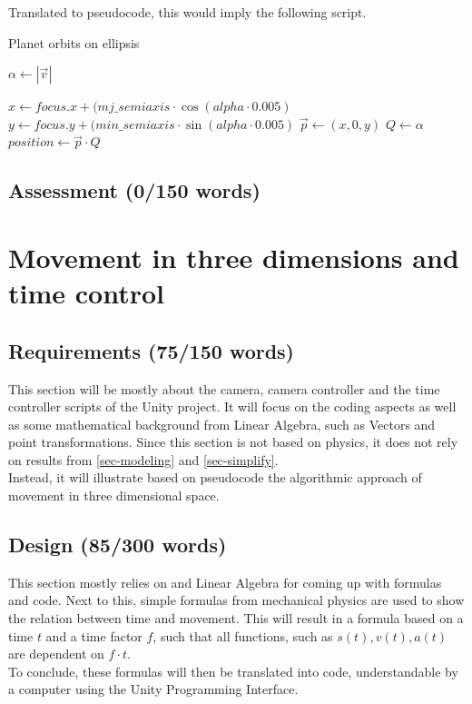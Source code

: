 \documentclass[conference,compsoc]{IEEEtran}
\begin{document}
Translated to pseudocode, this would imply the following script.
\begin{algorithm}
	\caption{Planet orbits on ellipsis}
	\begin{algorithmic}[1]
			\State $\alpha \leftarrow |\vec{v}|$ 
			
			\State $x \leftarrow focus.x + (mj\_semiaxis \cdot \cos(alpha \cdot 0.005)$
			\State $y \leftarrow focus.y + (min\_semiaxis \cdot \sin(alpha \cdot 0.005)$
			\State $\vec{p} \leftarrow (x, 0, y)$ 
			\State $Q \leftarrow \alpha$ 
			\State $position \leftarrow \vec{p} \cdot Q$
		\EndFunction
	\end{algorithmic}
\end{algorithm}

\subsection{Assessment (0/150 words)}

\section{Movement in three dimensions and time control}
\label{sec-movement-in-3D}
\subsection{Requirements (75/150 words)}
This section will be mostly about the camera, camera controller and the time controller scripts of the Unity project. It will focus on the coding aspects as well as some mathematical background from Linear Algebra, such as Vectors and point transformations. Since this section is not based on physics, it does not rely on results from \ref{sec-modeling} and \ref{sec-simplify}.\\
Instead, it will illustrate based on pseudocode the algorithmic approach of movement in three dimensional space. \\

\subsection{Design (85/300 words)}
This section mostly relies on \cite{UnityDoc} and Linear Algebra for coming up with formulas and code. Next to this, simple formulas from mechanical physics are used to show the relation between time and movement. This will result in a formula based on a time $t$ and a time factor $f$, such that all functions, such as $s(t), v(t), a(t)$ are dependent on $f \cdot t$. \\
To conclude, these formulas will then be translated into code, understandable by a computer using the Unity Programming Interface.
\end{document}
